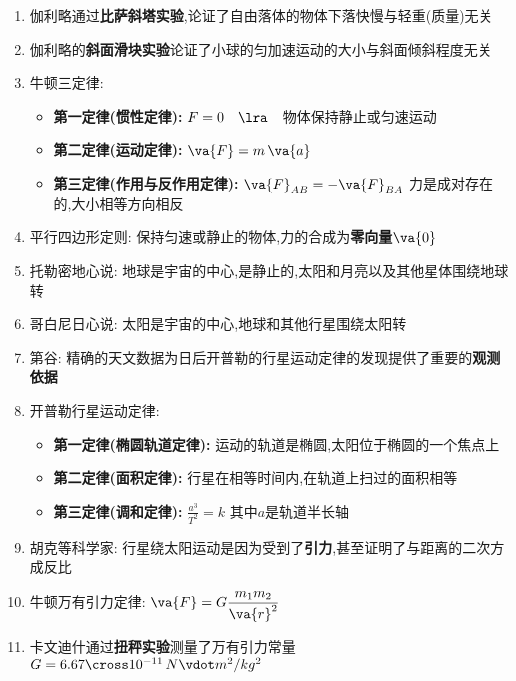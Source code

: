 \documentclass{article}
\begin{document}
\begin{itemize}
\begin{enumerate}
            \item 伽利略通过\textbf{比萨斜塔实验},论证了自由落体的物体下落快慢与轻重(质量)无关
            \item 伽利略的\textbf{斜面滑块实验}论证了小球的匀加速运动的大小与斜面倾斜程度无关
            \item 牛顿三定律:
            \begin{itemize}
                \item \textbf{第一定律(惯性定律):} $ F = 0 \quad \lra \quad $物体保持静止或匀速运动
                \item \textbf{第二定律(运动定律):} $ \va{F} = m \, \va{a} $
                \item \textbf{第三定律(作用与反作用定律):} $ \va{F}_{AB} = - \va{F}_{BA} $ 力是成对存在的,大小相等方向相反
            \end{itemize}
            \item 平行四边形定则: 保持匀速或静止的物体,力的合成为\textbf{零向量$\va{0}$}
            \item 托勒密地心说: 地球是宇宙的中心,是静止的,太阳和月亮以及其他星体围绕地球转
            \item 哥白尼日心说: 太阳是宇宙的中心,地球和其他行星围绕太阳转
            \item 第谷: 精确的天文数据为日后开普勒的行星运动定律的发现提供了重要的\textbf{观测依据}
            \item 开普勒行星运动定律:
            \begin{itemize}
                \item \textbf{第一定律(椭圆轨道定律):} 运动的轨道是椭圆,太阳位于椭圆的一个焦点上
                \item \textbf{第二定律(面积定律):} 行星在相等时间内,在轨道上扫过的面积相等
                \item \textbf{第三定律(调和定律):} $ \frac{a^{3}}{T^{2}} = k $ 其中$a$是轨道半长轴
            \end{itemize}
            \item 胡克等科学家: 行星绕太阳运动是因为受到了\textbf{引力},甚至证明了与距离的二次方成反比
            \item 牛顿万有引力定律: $ \va{F} = G\dfrac{m_{1}m_{2}}{\va{r}^{2}}$
            \item 卡文迪什通过\textbf{扭秤实验}测量了万有引力常量$G = 6.67 \cross 10^{-11} \, N \vdot m^{2}/kg^{2} $ 
            
            \vspace{-1em}


\end{enumerate}
\end{itemize}
\end{document}
